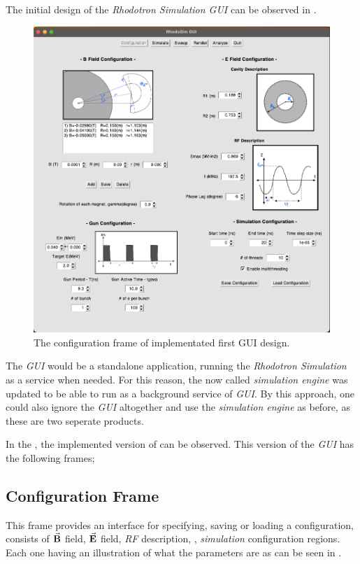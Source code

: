 \documentclass[a4paper,oneside,12pt]{report}
\numberwithin{equation}{chapter}
\begin{document}
The initial design of the \textit{Rhodotron Simulation GUI} can be observed in .
\begin{figure}[h]
    \centering
    \includegraphics[width=\linewidth]{./figures/rhodoSim/GUI_config_frame.png}
    \caption{The configuration frame of implementated first GUI design.}
    \label{fig:gui_config}
\end{figure}
The \textit{GUI} would be a standalone application, running the \textit{Rhodotron Simulation} as a service when needed. 
For this reason, the now called \textit{simulation engine} was updated to be able to run as a background service of \textit{GUI}.
By this approach, one could also ignore the \textit{GUI} altogether and use the \textit{simulation engine} as before, as these are two seperate products.

In the , the implemented version of  can be observed. This version of the \textit{GUI} has the following frames;

\subsection{Configuration Frame}
This frame provides an interface for specifying, saving or loading a configuration, consists of $\vec{\textbf{B}}$ field, $\vec{\textbf{E}}$ field, \textit{RF} description, \egun, \textit{simulation} configuration regions.
Each one having an illustration of what the parameters are as can be seen in .
\end{document}

